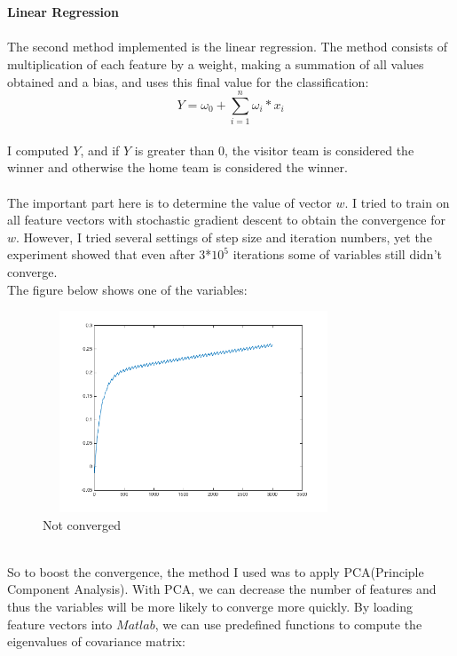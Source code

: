 \documentclass{article}
\begin{document}
\\
\\
\textbf{Linear Regression}
\\
\\
The second method implemented is the linear regression. The method consists of multiplication of each feature by a weight, making a summation of all values obtained and a bias, and uses this final value for the classification:
\begin{equation}
Y = \omega_0+\sum_{i=1}^{n}{\omega_i*x_i}
\end{equation}
\\
I computed $Y$, and if $Y$ is greater than 0, the visitor team is considered the winner and otherwise the home team is considered the winner. 
\\
\\
The important part here is to determine the value of vector $w$. I tried to train on all feature vectors with stochastic gradient descent to obtain the convergence for $w$. However, I tried several settings of step size and iteration numbers, yet the experiment showed that even after 3*$10^{5}$ iterations some of variables still didn't converge.
\\
The figure below shows one of the variables:
\\
 \begin{figure}[htbp]
 \centering
 \includegraphics[width=9cm, height=6cm]{notconverge}
  \caption{Not converged}
\end{figure}
\\
So to boost the convergence, the method I used was to apply PCA(Principle Component Analysis). With PCA, we can decrease the number of features and thus the variables will be more likely to converge more quickly.
By loading feature vectors into $Matlab$, we can use predefined functions to compute the eigenvalues of covariance matrix:
\end{document}
